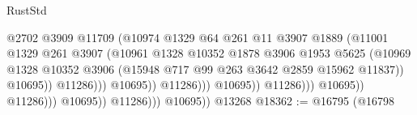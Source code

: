 \begin{lexlean}{RustStd}
\begin{coremodule}
                                                    @2702
                                                    @3909
                                                    @11709
                                                    (@10974
                                                      @1329
                                                      @64
                                                      @261
                                                      @11
                                                      @3907
                                                      @1889
                                                      (@11001
                                                        @1329
                                                        @261
                                                        @3907
                                                        (@10961
                                                          @1328
                                                          @10352
                                                          @1878
                                                          @3906
                                                          @1953
                                                          @5625
                                                          (@10969
                                                            @1328
                                                            @10352
                                                            @3906
                                                            (@15948
                                                              @717
                                                              @99
                                                              @263
                                                              @3642
                                                              @2859
                                                              @15962
                                                              @11837))
                                                          @10695))
                                                      @11286)))
                                                @10695))
                                            @11286)))
                                      @10695))
                                  @11286)))
                            @10695))
                        @11286)))
                  @10695))
              @11286)))
        @10695))
    @13268
@18362 := @16795
    (@16798

\end{coremodule}
\end{lexlean}

